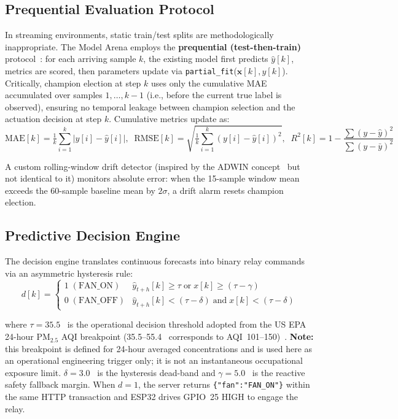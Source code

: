 \subsection{Prequential Evaluation Protocol}

In streaming environments, static train/test splits are methodologically inappropriate.
The Model Arena employs the \textbf{prequential (test-then-train)} protocol~\citep{gama2014survey}:
for each arriving sample $k$, the existing model first predicts $\hat{y}[k]$, metrics
are scored, then parameters update via \texttt{partial\_fit}($\mathbf{x}[k], y[k]$).
Critically, champion election at step $k$ uses only the cumulative MAE accumulated over
samples $1, \ldots, k-1$ (i.e., before the current true label is observed), ensuring
no temporal leakage between champion selection and the actuation decision at step $k$.
Cumulative metrics update as:
\begin{equation}
\mathrm{MAE}[k]=\tfrac{1}{k}\sum_{i=1}^k|y[i]-\hat{y}[i]|,\;\;
\mathrm{RMSE}[k]=\sqrt{\tfrac{1}{k}\sum_{i=1}^k(y[i]-\hat{y}[i])^2},\;\;
R^2[k]=1-\frac{\sum(y-\hat{y})^2}{\sum(y-\bar{y})^2}
\label{eq:metrics}
\end{equation}

A custom rolling-window drift detector (inspired by the ADWIN concept~\citep{bifet2007learning}
but not identical to it) monitors absolute error: when the 15-sample window mean exceeds
the 60-sample baseline mean by $2\sigma$, a drift alarm resets champion election.

\subsection{Predictive Decision Engine}

The decision engine translates continuous forecasts into binary relay commands via an
asymmetric hysteresis rule:
\begin{equation}
d[k]=\begin{cases}
1\;(\text{FAN\_ON})  & \hat{y}_{t+h}[k]\ge\tau \;\text{or}\; x[k]\ge(\tau-\gamma) \\
0\;(\text{FAN\_OFF}) & \hat{y}_{t+h}[k]<(\tau-\delta) \;\text{and}\; x[k]<(\tau-\delta)
\end{cases}
\label{eq:decision}
\end{equation}

\noindent where $\tau=35.5$~\ugsm{} is the operational decision threshold adopted from
the US EPA 24-hour PM$_{2.5}$ AQI breakpoint (35.5--55.4~\ugsm{} corresponds to
AQI~101--150)~\citep{usepaaqi2024}. \textbf{Note:} this breakpoint is defined for 24-hour
averaged concentrations and is used here as an operational engineering trigger only; it is
not an instantaneous occupational exposure limit. $\delta=3.0$~\ugsm{} is the hysteresis
dead-band and $\gamma=5.0$~\ugsm{} is the reactive safety fallback margin. When $d=1$,
the server returns \texttt{\{"fan":"FAN\_ON"\}} within the same HTTP transaction and
ESP32 drives GPIO~25 HIGH to engage the relay.

